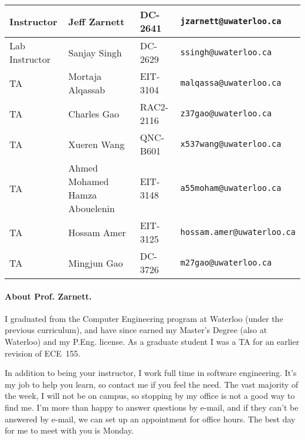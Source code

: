 \documentclass[letterpaper,10pt]{article}
\begin{document}
\begin{table}[h]
        \begin{center}
        \begin{tabular}{l|l|l|l}
                                        Instructor & Jeff Zarnett & DC-2641 & \texttt{jzarnett@uwaterloo.ca} \\
                                        \hline
                                        Lab Instructor & Sanjay Singh & DC-2629 & \texttt{ssingh@uwaterloo.ca}\\
                                        \hline

                                    TA & Mortaja Alqassab & EIT-3104 & \texttt{malqassa@uwaterloo.ca} \\
                                    TA & Charles Gao & RAC2-2116 & \texttt{z37gao@uwaterloo.ca} \\
                                    TA & Xueren Wang & QNC-B601 & \texttt{x537wang@uwaterloo.ca} \\
                                    TA & Ahmed Mohamed Hamza Abouelenin & EIT-3148 & \texttt{a55moham@uwaterloo.ca} \\
                                    TA & Hossam Amer & EIT-3125 & \texttt{hossam.amer@uwaterloo.ca} \\
                                    TA & Mingjun Gao & DC-3726 & \texttt{m27gao@uwaterloo.ca} \\
                                                   \end{tabular}
        \end{center}
\end{table}


\paragraph{About Prof. Zarnett.}
I graduated from the Computer Engineering program at Waterloo (under the previous curriculum), and have since earned my Master's Degree (also at Waterloo) and my P.Eng. license. As a graduate student I was a TA for an earlier revision of ECE~155.

In addition to being your instructor, I work full time in software engineering. It's my job to help you learn, so contact me if you feel the need. The vast majority of the week, I will not be on campus, so stopping by my office is not a good way to find me. I'm more than happy to answer questions by e-mail, and if they can't be answered by e-mail, we can set up an appointment for office hours. The best day for me to meet with you is Monday.
\end{document}
